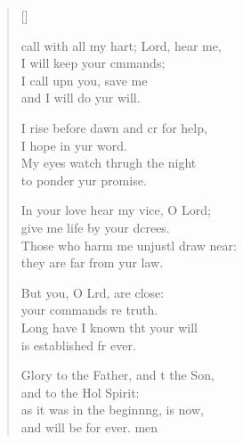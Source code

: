 \settowidth{\versewidth}{I call with all my heart; Lord, hear me, *}
\begin{verse}[\versewidth]
  \begin{patverse}
     call with all my hart; Lord, hear me,\Med\\
I will keep your cmmands;\\
I call upn you, save me\Med\\
and I will do yur will.

I rise before dawn and cr for help,\Med\\
I hope in yur word.\\
My eyes watch thrugh the night\Med\\
to ponder yur promise.

In your love hear my vice, O Lord;\Med\\
give me life by your dcrees.\\
Those who harm me unjustl draw near:\Med\\
they are far from yur law.

But you, O Lrd, are close:\Med\\
your commands re truth.\\
Long have I known tht your will\Med\\
is established fr ever.

Glory to the Father, and t the Son,\Med\\
and to the Hol Spirit:\\
as it was in the beginn\pointup{\i}ng, is now,\Med\\
and will be for ever. men
  \end{patverse}
\end{verse}
